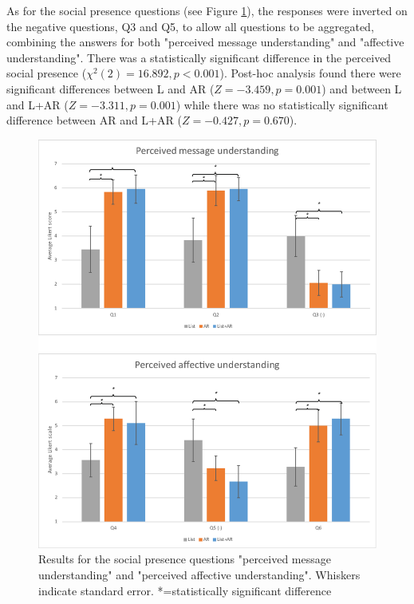 As for the social presence questions (see Figure \ref{fig:mgia16:social_presence}), the responses were inverted on the negative questions, Q3 and Q5, to allow all questions to be aggregated, combining the answers for both "perceived message understanding" and "affective understanding". There was a statistically significant difference in the perceived social presence ($\chi^2(2)=16.892, p<0.001$). Post-hoc analysis found there were significant differences between L and AR ($Z=-3.459, p=0.001$) and between L and L+AR ($Z=-3.311, p=0.001$) while there was no statistically significant difference between AR and L+AR ($Z=-0.427, p=0.670$). 



\begin{figure}[htb]
  \centering
  \includegraphics[width=.8\linewidth]{images/61-video-mgia16/social-presence.eps}
  \caption{Results for the social presence questions "perceived message understanding" and "perceived affective understanding". Whiskers indicate standard error. *=statistically significant difference}
    \label{fig:mgia16:social_presence}
\end{figure}

